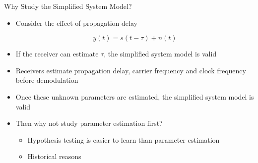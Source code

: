 \documentclass[t]{beamer}
\begin{document}
\begin{frame}{Why Study the Simplified System Model?}
  \footnotesize
  \begin{itemize}
    \item \pause Consider the effect of propagation delay
      \begin{figure}
        \centering
      \end{figure}
      \begin{equation*}
        y(t) = s(t - \tau) + n(t)
      \end{equation*}
    \item \pause If the receiver can estimate $\tau$, the simplified system model is valid
    \item \pause Receivers estimate propagation delay, carrier frequency and clock frequency before demodulation
    \item \pause Once these unknown parameters are estimated, the simplified system model is valid
    \item \pause Then why not study parameter estimation first?
      \begin{itemize}
        \footnotesize
        \item \pause Hypothesis testing is easier to learn than parameter estimation
        \item \pause Historical reasons
      \end{itemize}
  \end{itemize}
  \normalsize
\end{frame}
\end{document}
